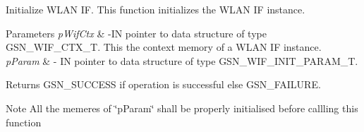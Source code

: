 Initialize WLAN IF. This function initializes the WLAN IF instance. 


\begin{DoxyParams}{Parameters}
{\em pWifCtx} & -\/IN pointer to data structure of type GSN\_\-WIF\_\-CTX\_\-T. This the context memory of a WLAN IF instance. \\
\hline
{\em pParam} & -\/ IN pointer to data structure of type GSN\_\-WIF\_\-INIT\_\-PARAM\_\-T. \\
\hline
\end{DoxyParams}
\begin{DoxyReturn}{Returns}
GSN\_\-SUCCESS if operation is successful else GSN\_\-FAILURE. 
\end{DoxyReturn}
\begin{DoxyNote}{Note}
All the memeres of \char`\"{}pParam\char`\"{} shall be properly initialised before callling this function 
\end{DoxyNote}
